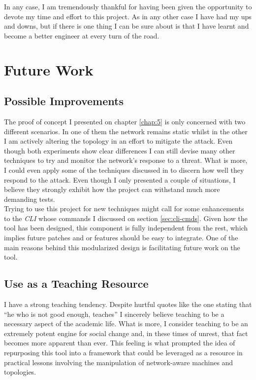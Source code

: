     In any case, I am tremendously thankful for having been given the opportunity to devote my time and effort to this project. As in any other case I have had my ups and downs, but if there is one thing I can be sure about is that I have learnt and become a better engineer at every turn of the road.\\

    \section{Future Work}
        \subsection{Possible Improvements}
            The proof of concept I presented on chapter \ref{chap:5} is only concerned with two different scenarios. In one of them the network remains static whilst in the other I am actively altering the topology in an effort to mitigate the attack. Even though both experiments show clear differences I can still devise many other techniques to try and monitor the network's response to a threat. What is more, I could even apply some of the techniques discussed in \cite{bib:react} to discern how well they respond to the attack. Even though I only presented a couple of situations, I believe they strongly exhibit how the project can withstand much more demanding tests.\\

            Trying to use this project for new techniques might call for some enhancements to the \textit{CLI} whose commands I discussed on section \ref{sec:cli-cmds}. Given how the tool has been designed, this component is fully independent from the rest, which implies future patches and or features should be easy to integrate. One of the main reasons behind this modularized design is facilitating future work on the tool.\\

        \subsection{Use as a Teaching Resource}
            I have a strong teaching tendency. Despite hurtful quotes like the one stating that ``he who is not good enough, teaches'' I sincerely believe teaching to be a necessary aspect of the academic life. What is more, I consider teaching to be an extremely potent engine for social change and, in these times of unrest, that fact becomes more apparent than ever. This feeling is what prompted the idea of repurposing this tool into a framework that could be leveraged as a resource in practical lessons involving the manipulation of network-aware machines and topologies.\\

